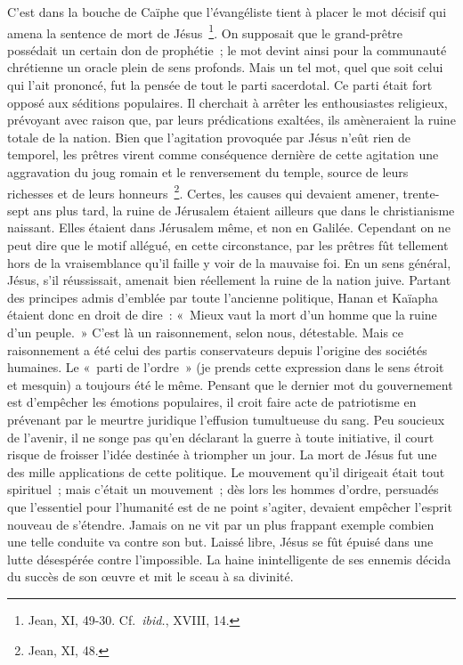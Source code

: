 \documentclass[french,twoside]{book} %
\begin{document}
C’est dans la bouche de Caïphe que l’évangéliste tient à placer le mot décisif qui amena la sentence de mort de Jésus \footnote{ Jean, XI, 49-30. Cf. {\itshape ibid.}, XVIII, 14.}. On supposait que le grand-prêtre possédait un certain don de prophétie ; le mot devint ainsi pour la communauté chrétienne un oracle plein de sens profonds. Mais un tel mot, quel que soit celui qui l’ait prononcé, fut la pensée de tout le parti sacerdotal. Ce parti était fort opposé aux séditions populaires. Il cherchait à arrêter les enthousiastes religieux, prévoyant avec raison que, par leurs prédications exaltées, ils amèneraient la ruine totale de la nation. Bien que l’agitation provoquée par Jésus n’eût rien de temporel, les prêtres virent comme conséquence dernière de cette agitation une aggravation du joug romain et le renversement du temple, source de leurs richesses et de leurs honneurs \footnote{Jean, XI, 48.}. Certes, les causes qui devaient amener, trente-sept ans plus tard, la ruine de Jérusalem étaient ailleurs que dans le christianisme naissant. Elles étaient dans Jérusalem même, et non en Galilée. Cependant on ne peut dire que le motif allégué, en cette circonstance, par les prêtres fût tellement hors de la vraisemblance qu’il faille y voir de la mauvaise foi. En un sens général, Jésus, s’il réussissait, amenait bien réellement la ruine de la nation juive. Partant des principes admis d’emblée par toute l’ancienne politique, Hanan et Kaïapha étaient donc en droit de dire : « Mieux vaut la mort d’un homme que la ruine d’un peuple. » C’est là un raisonnement, selon nous, détestable. Mais ce raisonnement a été celui des partis conservateurs depuis l’origine des sociétés humaines. Le « parti de l’ordre » (je prends cette expression dans le sens étroit et mesquin) a toujours été le même. Pensant que le dernier mot du gouvernement est d’empêcher les émotions populaires, il croit faire acte de patriotisme en prévenant par le meurtre juridique l’effusion tumultueuse du sang. Peu soucieux de l’avenir, il ne songe pas qu’en déclarant la guerre à toute initiative, il court risque de froisser l’idée destinée à triompher un jour. La mort de Jésus fut une des mille applications de cette politique. Le mouvement qu’il dirigeait était tout spirituel ; mais c’était un mouvement ; dès lors les hommes d’ordre, persuadés que l’essentiel pour l’humanité est de ne point s’agiter, devaient empêcher l’esprit nouveau de s’étendre. Jamais on ne vit par un plus frappant exemple combien une telle conduite va contre son but. Laissé libre, Jésus se fût épuisé dans une lutte désespérée contre l’impossible. La haine inintelligente de ses ennemis décida du succès de son œuvre et mit le sceau à sa divinité.\par
\end{document}

